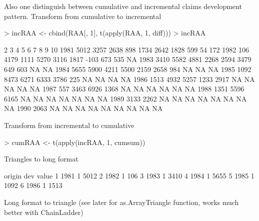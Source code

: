 \documentclass[a4paper]{article}
\begin{document}
Also one distinguish between cumulative and incremental claims development pattern.
Transform from cumulative to incremental
\begin{Schunk}
\begin{Sinput}
> incRAA <- cbind(RAA[, 1], t(apply(RAA, 1, diff)))
> incRAA
\end{Sinput}
\begin{Soutput}
             2    3    4    5    6    7   8   9  10
1981 5012 3257 2638  898 1734 2642 1828 599  54 172
1982  106 4179 1111 5270 3116 1817 -103 673 535  NA
1983 3410 5582 4881 2268 2594 3479  649 603  NA  NA
1984 5655 5900 4211 5500 2159 2658  984  NA  NA  NA
1985 1092 8473 6271 6333 3786  225   NA  NA  NA  NA
1986 1513 4932 5257 1233 2917   NA   NA  NA  NA  NA
1987  557 3463 6926 1368   NA   NA   NA  NA  NA  NA
1988 1351 5596 6165   NA   NA   NA   NA  NA  NA  NA
1989 3133 2262   NA   NA   NA   NA   NA  NA  NA  NA
1990 2063   NA   NA   NA   NA   NA   NA  NA  NA  NA
\end{Soutput}
\end{Schunk}
Transform from incremental to cumulative
\begin{Schunk}
\begin{Sinput}
> cumRAA <- t(apply(incRAA, 1, cumsum))
\end{Sinput}
\end{Schunk}
Triangles to long format
\begin{Schunk}
\begin{Soutput}
  origin dev value
1   1981   1  5012
2   1982   1   106
3   1983   1  3410
4   1984   1  5655
5   1985   1  1092
6   1986   1  1513
\end{Soutput}
\end{Schunk}
Long format to triangle (see later for as.ArrayTriangle function, works much better with ChainLadder)
\end{document}
